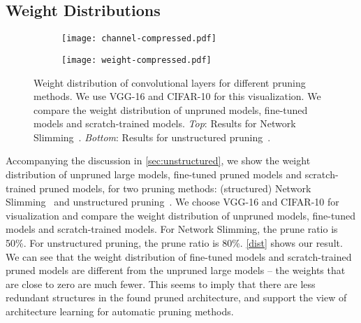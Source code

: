 \subsection{Weight Distributions}
\label{sec:dist}
\begin{figure}[!htbp]
\centering
\begin{minipage}{\textwidth}
 \begin{subfigure}{\textwidth}
 \centering
 \texttt{[image: channel-compressed.pdf]}
 \label{arch-search-b1}
 \end{subfigure}
\end{minipage}
\begin{minipage}{\textwidth}
 \begin{subfigure}{\textwidth}
 \centering
\texttt{[image: weight-compressed.pdf]}
 \label{arch-search-b}
 \end{subfigure}
\end{minipage}
    \caption{Weight distribution of convolutional layers for different pruning methods. We use VGG-16 and CIFAR-10 for this visualization. We compare the weight distribution of unpruned models,  fine-tuned models and scratch-trained models. \emph{Top}: Results for Network Slimming~\cite{liu2017learning}. \emph{Bottom}: Results for unstructured pruning~\cite{han2015learning}.}  
    \label{dist}
\end{figure}

Accompanying the discussion in \autoref{sec:unstructured}, we show the weight distribution of unpruned large models, fine-tuned pruned models and scratch-trained pruned models, for two pruning methods: (structured) Network Slimming~\cite{liu2017learning} and unstructured pruning~\cite{han2015learning}. We choose VGG-16 and CIFAR-10 for visualization and compare the weight distribution of unpruned models, fine-tuned models and scratch-trained models. For Network Slimming, the prune ratio is 50\%. For unstructured pruning, the prune ratio is 80\%. \autoref{dist} shows our result.  We can see that the weight distribution of fine-tuned models and scratch-trained pruned models are  different from the unpruned large models -- the weights that are close to zero are much fewer.  This seems to imply that there are less redundant structures in the found pruned architecture, and support the view of architecture learning for automatic pruning methods.

